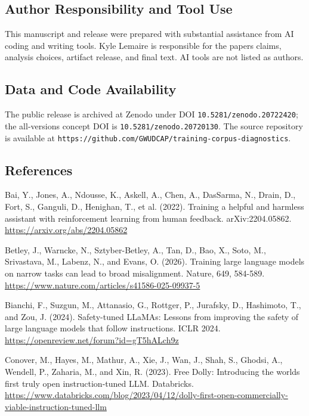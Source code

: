 \documentclass[11pt]{article}
\begin{document}
\subsection{Author Responsibility and Tool Use}\label{author-responsibility-and-tool-use}

This manuscript and release were prepared with substantial assistance from AI coding and writing tools. Kyle Lemaire is responsible for the paper\textquotesingle s claims, analysis choices, artifact release, and final text. AI tools are not listed as authors.

\subsection{Data and Code Availability}\label{data-and-code-availability}

The public release is archived at Zenodo under DOI \texttt{10.5281/zenodo.20722420}; the all-versions concept DOI is \texttt{10.5281/zenodo.20720130}. The source repository is available at \texttt{https://github.com/GWUDCAP/training-corpus-diagnostics}.

\subsection{References}\label{references}

Bai, Y., Jones, A., Ndousse, K., Askell, A., Chen, A., DasSarma, N., Drain, D., Fort, S., Ganguli, D., Henighan, T., et al. (2022). Training a helpful and harmless assistant with reinforcement learning from human feedback. arXiv:2204.05862. \url{https://arxiv.org/abs/2204.05862}

Betley, J., Warncke, N., Sztyber-Betley, A., Tan, D., Bao, X., Soto, M., Srivastava, M., Labenz, N., and Evans, O. (2026). Training large language models on narrow tasks can lead to broad misalignment. Nature, 649, 584-589. \url{https://www.nature.com/articles/s41586-025-09937-5}

Bianchi, F., Suzgun, M., Attanasio, G., Rottger, P., Jurafsky, D., Hashimoto, T., and Zou, J. (2024). Safety-tuned LLaMAs: Lessons from improving the safety of large language models that follow instructions. ICLR 2024. \url{https://openreview.net/forum?id=gT5hALch9z}

Conover, M., Hayes, M., Mathur, A., Xie, J., Wan, J., Shah, S., Ghodsi, A., Wendell, P., Zaharia, M., and Xin, R. (2023). Free Dolly: Introducing the world\textquotesingle s first truly open instruction-tuned LLM. Databricks. \url{https://www.databricks.com/blog/2023/04/12/dolly-first-open-commercially-viable-instruction-tuned-llm}
\end{document}
